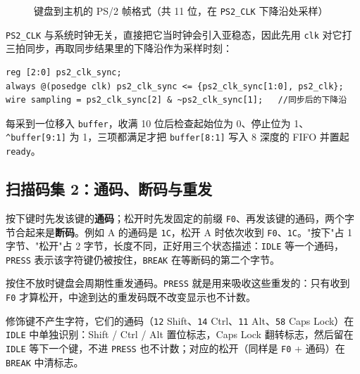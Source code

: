 \documentclass[12pt, a4paper]{ctexart}
\begin{document}
\begin{figure}[htbp]
    \centering
    \caption{键盘到主机的 PS/2 帧格式（共 11 位，在 \texttt{PS2\_CLK} 下降沿处采样）}
\end{figure}

\texttt{PS2\_CLK} 与系统时钟无关，直接把它当时钟会引入亚稳态，因此先用 \texttt{clk} 对它打三拍同步，再取同步结果里的下降沿作为采样时刻：

\begin{lstlisting}
reg [2:0] ps2_clk_sync;
always @(posedge clk) ps2_clk_sync <= {ps2_clk_sync[1:0], ps2_clk};
wire sampling = ps2_clk_sync[2] & ~ps2_clk_sync[1];   //同步后的下降沿
\end{lstlisting}

\noindent 每采到一位移入 \texttt{buffer}，收满 10 位后检查起始位为 0、停止位为 1、\texttt{\textasciicircum buffer[9:1]} 为 1，三项都满足才把 \texttt{buffer[8:1]} 写入 8 深度的 FIFO 并置起 \texttt{ready}。

\subsection{扫描码集 2：通码、断码与重发}
按下键时先发该键的\textbf{通码}；松开时先发固定的前缀 \texttt{F0}、再发该键的通码，两个字节合起来是\textbf{断码}。例如 A 的通码是 \texttt{1C}，松开 A 时依次收到 \texttt{F0}、\texttt{1C}。"按下"占 1 字节、"松开"占 2 字节，长度不同，正好用三个状态描述：\texttt{IDLE} 等一个通码，\texttt{PRESS} 表示该字符键仍被按住，\texttt{BREAK} 在等断码的第二个字节。

按住不放时键盘会周期性重发通码。\texttt{PRESS} 就是用来吸收这些重发的：只有收到 \texttt{F0} 才算松开，中途到达的重发码既不改变显示也不计数。

修饰键不产生字符，它们的通码（\texttt{12} Shift、\texttt{14} Ctrl、\texttt{11} Alt、\texttt{58} Caps Lock）在 \texttt{IDLE} 中单独识别：Shift / Ctrl / Alt 置位标志，Caps Lock 翻转标志，然后留在 \texttt{IDLE} 等下一个键，不进 \texttt{PRESS} 也不计数；对应的松开（同样是 \texttt{F0} + 通码）在 \texttt{BREAK} 中清标志。
\end{document}
